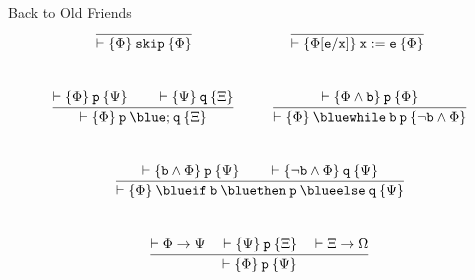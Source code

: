 \documentclass{beamer}
\begin{document}
\begin{frame}{Back to Old Friends}
        \[
                \infer{ \vdash \{ \Phi \} \> \prog{skip} \> \{ \Phi \} }{}
                \hspace{2.5cm}
                \infer{ \vdash \{ \Phi[\prog{e}/\prog{x}] \} \> \prog{ x : = e } \>
                \{ \Phi \} }{}
        \]
        \\[5pt]
        \[
                \infer { \vdash \{ \Phi \} \> \prog{p \> {\blue ;} \> q} \> \{ \Xi \} }{
                        \vdash \{ \Phi \} \> \prog{p} \> \{ \Psi \}
                        \qquad
                        \vdash \{ \Psi \} \> \prog{q} \> \{ \Xi \}
                }
                \hspace{1cm}
                \infer{
                        \vdash \{ \Phi \} \> \prog{{\blue while}} \> \prog{b} \>
                        \prog{p} \> 
                        \{ \neg \prog{b} \wedge \Phi \}
                }{
                        \vdash
                        \{ \Phi \wedge \prog{b} \} \> \prog{p} \> \{ \Phi \}
                }
        \]
        \\[5pt]
        \[
                \infer {
                        \vdash \{ \Phi \} \> \prog{{\blue if} \> b}
                        \> \prog{{\blue then}} \>
                        \prog{p} \> \prog{{\blue else}} \> \prog{q}
                        \> \{ \Psi \}
                }{
                        \vdash \{ \prog{b} \wedge \Phi \} \> \prog{p} \> \{ \Psi \}
                        \qquad
                        \vdash \{ \prog{\neg b} \wedge \Phi \} \> \prog{q} \> \{ \Psi \}
                }
        \]
        \\[5pt]
        \[
                \infer{ \vdash \{ \Phi \} \> \prog{p} \> \{ \Psi \} }{
                        \vdash \Phi \rightarrow \Psi
                        \quad
                        \vdash \{ \Psi \} \> \prog{p} \> \{ \Xi \}
                        \quad
                        \vdash \Xi \rightarrow \Omega
                }
        \]
\end{frame}


\end{document}
